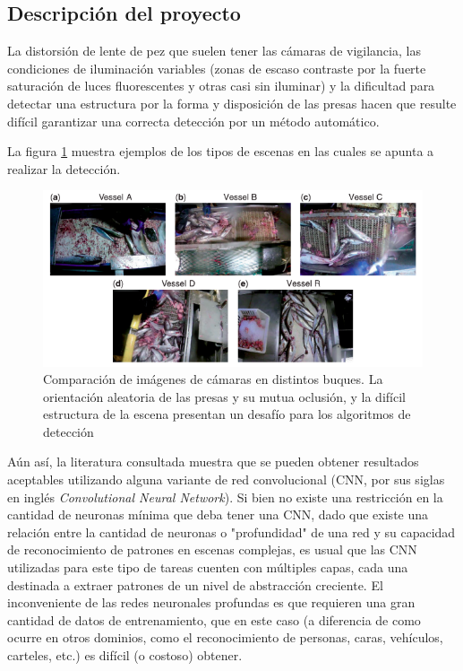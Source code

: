 \documentclass[11pt]{charter}
\begin{document}
\subsection{Descripción del proyecto}

La distorsión de lente de pez que suelen tener las cámaras de vigilancia, las condiciones de iluminación variables (zonas de escaso contraste por la fuerte saturación de luces fluorescentes y otras casi sin iluminar) y la dificultad para detectar una estructura por la forma y disposición de las presas hacen que resulte difícil garantizar una correcta detección por un método automático.

La figura \ref{fig:ejemplos_escenas} muestra ejemplos de los tipos de escenas en las cuales se apunta a realizar la detección.

\begin{figure}[htpb]
\centering 
\includegraphics[width=1.\textwidth]{./Figuras/ejemplos_escenas.png}
\caption{Comparación de imágenes de cámaras en distintos buques. La orientación aleatoria de las presas y su mutua oclusión, y la difícil estructura de la escena presentan un desafío para los algoritmos de detección}
\label{fig:ejemplos_escenas}
\end{figure}

Aún así, la literatura consultada muestra que se pueden obtener resultados aceptables utilizando alguna variante de red convolucional (CNN, por sus siglas en inglés {\em Convolutional Neural Network}). 
Si bien no existe una restricción en la cantidad de neuronas mínima que deba tener una CNN, dado que
existe una relación entre la cantidad de neuronas o "profundidad" de una red y su capacidad de reconocimiento de patrones en escenas complejas, es usual que las CNN utilizadas para este tipo de tareas cuenten con múltiples capas, cada una destinada a extraer patrones de un nivel de abstracción creciente.
El inconveniente de las redes neuronales profundas es que requieren una gran cantidad de datos de entrenamiento, que en este caso (a diferencia de como ocurre en otros dominios, como el reconocimiento de personas, caras, vehículos, carteles, etc.) es difícil (o costoso) obtener.
\end{document}
